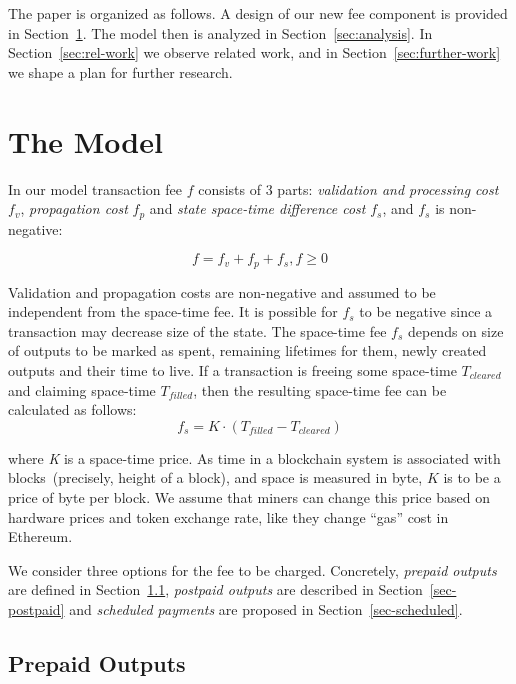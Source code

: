 \documentclass[]{llncs}   %
\newcommand{\authnote}[2]{\marginpar{\parbox{\marginparwidth}{\tiny %
  \textsf{#1 {\textcolor{blue}{notes: #2}}}}}%
  \textcolor{blue}{\textbf{\dag}}}
\newcommand{\authnote}[2]{
  \textsf{#1 \textcolor{blue}{: #2}}}
\newcommand{\authnote}[2]{}
\newcommand{\knote}[1]{{\authnote{\textcolor{green}{Alex notes}}{#1}}}
\begin{document}
The paper is organized as follows. A design of our new fee component is provided in Section~\ref{sec:model}. The model then is analyzed in Section~\ref{sec:analysis}. In Section~\ref{sec:rel-work} we observe related work, and in Section~\ref{sec:further-work} we shape a plan for further research.

\section{The Model}
\label{sec:model}

In our model transaction fee $f$ consists of 3 parts: \textit{validation and processing cost} $f_v$, \textit{propagation cost} $f_p$ and \textit{state space-time difference cost} $f_s$, and $f_s$ is non-negative:

\begin{equation}
f = f_v + f_p + f_s , f \ge 0
\end{equation}

Validation and propagation costs are non-negative and assumed to be independent from the space-time fee. It is possible for $f_s$ to be negative since a transaction may decrease size of the state. The space-time fee $f_s$ depends on size of outputs to be marked as spent, remaining lifetimes for them, newly created outputs and their time to live. If a transaction is freeing some space-time \textit{$T_{cleared}$} and claiming space-time \textit{$T_{filled}$}, then the  resulting space-time fee can be calculated as follows:
\begin{equation}
f_s = K \cdot (T_{filled} - T_{cleared})
\end{equation}

\knote{we need to say somehow here about prepaid and postpaid outputs defined below}

where \textit{K} is a space-time price. As time in a blockchain system is associated with blocks~(precisely, height of a block), and space is measured in byte, $K$ is to be a price of byte per block. We assume that miners can change this price based on hardware prices and token exchange rate, like they change ``gas'' cost in Ethereum.

We consider three options for the fee to be charged. Concretely, \textit{prepaid outputs} are defined in Section~\ref{sec-prepaid}, \textit{postpaid outputs} are described in Section~\ref{sec-postpaid} and \textit{scheduled payments} are proposed in Section~\ref{sec-scheduled}.

\subsection{Prepaid Outputs}
\label{sec-prepaid}
\end{document}
